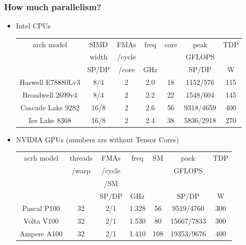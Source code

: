 \documentclass[12pt,dvipdfmx]{beamer}
\newcommand{\mura}[1]{{\color{purple}#1}}
\begin{document}
\begin{frame}
\frametitle{How much parallelism?}
\begin{itemize}
\item Intel CPUs

{\footnotesize
\begin{tabular}{|c|c|c|c|c|c|c|}\hline
arch       model             & SIMD & FMAs   & freq & core & peak      & TDP \\
                             & width& /cycle &      &      & GFLOPS    &     \\
                             & SP/DP& /core  & GHz  &      & SP/DP     & W   \\\hline
Haswell {\tiny E78880Lv3}    & 8/4  & 2      & 2.0  & 18   & 1152/576  & 115 \\
Broadwell {\tiny 2699v4}     & 8/4  & 2      & 2.2  & 22   & 1548/604  & 145 \\
Cascade Lake {\tiny 9282}    & 16/8 & 2  & 2.6  & 56   & 9318/4659 & 400 \\
\mura{Ice Lake {\tiny 8368}} & 16/8 & 2  & 2.4  & 38   & \mura{5836/2918} & 270 \\\hline
\end{tabular}}

\item NVIDIA GPUs (numbers are without Tensor Cores)

{\footnotesize
\begin{tabular}{|c|c|c|c|c|c|c|}\hline
acrh     model      & threads & FMAs   & freq  & SM       & paek   & TDP     \\
                    & /warp   & /cycle &       &          & GFLOPS &         \\
                    &         & /SM    &       &          &        &         \\
                    &         & SP/DP  & GHz   &          & SP/DP  & W       \\\hline
Pascal {\tiny P100} & 32  & 2/1 & 1.328 & 56  & 9519/4760  & 300     \\
Volta {\tiny V100}  & 32  & 2/1 & 1.530 & 80  & 15667/7833 & 300     \\
\mura{Ampere {\tiny A100}} & 32  & 2/1 & 1.410 & 108 & \mura{19353/9676} & 400     \\\hline
\end{tabular}}
\end{itemize}


\end{frame}
\end{document}
